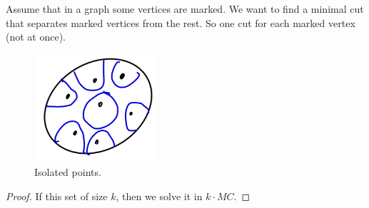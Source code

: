 \begin{algorithm}
    Assume that in a graph some vertices are marked.
    We want to find a minimal cut that separates marked vertices from the rest.
    So one cut for each marked vertex (not at once).
\begin{figure}[H]
        \centering
        \includegraphics[width=0.4\textwidth]{figures/581ED485-1C5A-4F35-AF4B-8D1AB8E575EA}
        \caption{Isolated points.}
        \label{fig:581ed485-1c5a-4f35-af4b-8d1ab8e575ea}
    \end{figure}
\end{algorithm}
\begin{proof}
    If this set of size $k$, then we solve it in $k \cdot MC$.

\end{proof}